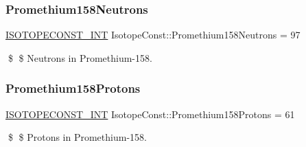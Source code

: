 \subsubsection{\texorpdfstring{Promethium158\+Neutrons}{Promethium158Neutrons}}
{\footnotesize\ttfamily \mbox{\hyperlink{group___isotope_const-_macros_ga5f18360b3e99483a35c32d789e62621c}{I\+S\+O\+T\+O\+P\+E\+C\+O\+N\+S\+T\+\_\+\+I\+NT}} Isotope\+Const\+::\+Promethium158\+Neutrons = 97}

\$ \$ Neutrons in Promethium-\/158. \mbox{\label{group___isotope_const-_promethium-_pm158_ga00cada2503207cdaaefb0d55fa934b2f}} 
\subsubsection{\texorpdfstring{Promethium158\+Protons}{Promethium158Protons}}
{\footnotesize\ttfamily \mbox{\hyperlink{group___isotope_const-_macros_ga5f18360b3e99483a35c32d789e62621c}{I\+S\+O\+T\+O\+P\+E\+C\+O\+N\+S\+T\+\_\+\+I\+NT}} Isotope\+Const\+::\+Promethium158\+Protons = 61}

\$ \$ Protons in Promethium-\/158. 